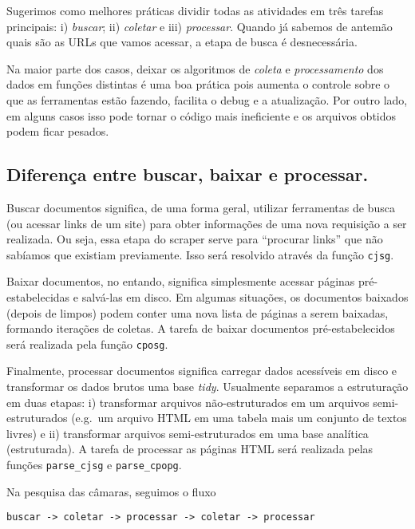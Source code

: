 \documentclass[]{book}
\begin{document}
Sugerimos como melhores práticas dividir todas as atividades em três
tarefas principais: i) \emph{buscar}; ii) \emph{coletar} e iii)
\emph{processar}. Quando já sabemos de antemão quais são as URLs que
vamos acessar, a etapa de busca é desnecessária.

Na maior parte dos casos, deixar os algoritmos de \emph{coleta} e
\emph{processamento} dos dados em funções distintas é uma boa prática
pois aumenta o controle sobre o que as ferramentas estão fazendo,
facilita o debug e a atualização. Por outro lado, em alguns casos isso
pode tornar o código mais ineficiente e os arquivos obtidos podem ficar
pesados.

\subsection{Diferença entre buscar, baixar e
processar.}\label{diferenca-entre-buscar-baixar-e-processar.}

Buscar documentos significa, de uma forma geral, utilizar ferramentas de
busca (ou acessar links de um site) para obter informações de uma nova
requisição a ser realizada. Ou seja, essa etapa do scraper serve para
``procurar links'' que não sabíamos que existiam previamente. Isso será
resolvido através da função \texttt{cjsg}.

Baixar documentos, no entando, significa simplesmente acessar páginas
pré-estabelecidas e salvá-las em disco. Em algumas situações, os
documentos baixados (depois de limpos) podem conter uma nova lista de
páginas a serem baixadas, formando iterações de coletas. A tarefa de
baixar documentos pré-estabelecidos será realizada pela função
\texttt{cposg}.

Finalmente, processar documentos significa carregar dados acessíveis em
disco e transformar os dados brutos uma base \emph{tidy}. Usualmente
separamos a estruturação em duas etapas: i) transformar arquivos
não-estruturados em um arquivos semi-estruturados (e.g.~um arquivo HTML
em uma tabela mais um conjunto de textos livres) e ii) transformar
arquivos semi-estruturados em uma base analítica (estruturada). A tarefa
de processar as páginas HTML será realizada pelas funções
\texttt{parse\_cjsg} e \texttt{parse\_cpopg}.

Na pesquisa das câmaras, seguimos o fluxo

\begin{verbatim}
buscar -> coletar -> processar -> coletar -> processar
\end{verbatim}
\end{document}
